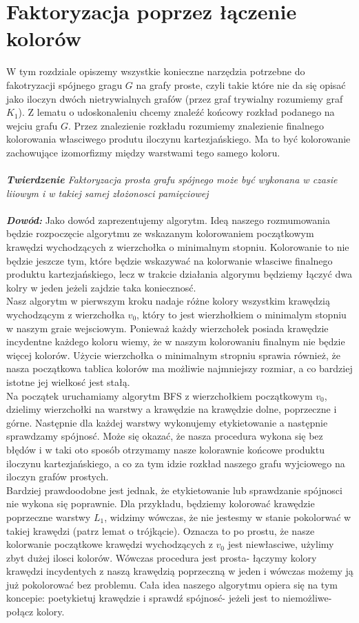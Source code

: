 \documentclass[12pt,a4paper,titlepage]{article}
\begin{document}
\section{Faktoryzacja poprzez łączenie kolorów}
W tym rozdziale opiszemy wszystkie konieczne narzędzia potrzebne do fakotryzacji spójnego gragu $G$ na grafy proste, czyli takie które nie da się opisać jako iloczyn dwóch nietrywialnych grafów (przez graf trywialny rozumiemy graf $K_1$). Z lematu o udoskonaleniu chcemy znaleźć końcowy rozkład podanego na wejciu grafu $G$. Przez znalezienie rozkładu rozumiemy znalezienie finalnego kolorowania własciwego produtu iloczynu kartezjańskiego. Ma to być kolorowanie zachowujące izomorfizmy między warstwami tego samego koloru.\\
\\
\textit{\textbf{Twierdzenie} Faktoryzacja prosta grafu spójnego może być wykonana w czasie liiowym i w takiej samej złożonosci pamięciowej}\\
\\
\textit{\textbf{Dowód:}} Jako dowód zaprezentujemy algorytm. Ideą naszego rozmumowania będzie rozpoczęcie algorytmu ze wskazanym kolorowaniem początkowym krawędzi wychodzących z wierzchołka o minimalnym stopniu. Kolorowanie to nie będzie jeszcze tym, które będzie wskazywać na kolorwanie własciwe finalnego produktu kartezjańskiego, lecz w trakcie działania algorymu będziemy łączyć dwa kolry w jeden jeżeli zajdzie taka koniecznosć. \\
Nasz algorytm w pierwszym kroku nadaje różne kolory wszystkim krawędzią wychodzącym z wierzchołka $v_0$, który to jest wierzhołkiem o minimalym stopniu w naszym graie wejsciowym. Ponieważ każdy wierzchołek posiada krawędzie incydentne każdego koloru wiemy, że w naszym kolorowaniu finalnym nie będzie więcej kolorów. Użycie wierzchołka o minimalnym stropniu sprawia również, że nasza początkowa tablica kolorów ma możliwie najmniejszy rozmiar, a co bardziej istotne jej wielkosć jest stałą. \\
Na początek uruchamiamy algorytm BFS z wierzchołkiem początkowym $v_0$, dzielimy wierzchołki na warstwy a krawędzie na krawędzie dolne, poprzeczne i górne. Następnie dla każdej warstwy wykonujemy etykietowanie a następnie sprawdzamy spójnosć. Może się okazać, że nasza procedura wykona się bez błędów i w taki oto sposób otrzymamy nasze kolorawnie końcowe produktu iloczynu kartezjańskiego, a co za tym idzie rozkład naszego grafu wyjciowego na iloczyn grafów prostych.\\
Bardziej prawdoodobne jest jednak, że etykietowanie lub sprawdzanie spójnosci nie wykona się poprawnie. Dla przykładu, będziemy kolorować krawędzie poprzeczne warstwy $L_1$, widzimy wówczas, że nie jestesmy w stanie pokolorwać w takiej krawędzi (patrz lemat o trójkącie). Oznacza to po prostu, że nasze kolorwanie początkowe krawędzi wychodzących z $v_0$ jest niewłasciwe, użylimy zbyt dużej ilosci kolorów. Wówczas procedura jest prosta- łączymy kolory krawędzi incydentych z naszą krawędzią poprzeczną w jeden i wówczas możemy ją już pokolorować bez problemu. Cała idea naszego algorytmu opiera się na tym koncepie: poetykietuj krawędzie i sprawdź spójnosć- jeżeli jest to niemożliwe- połącz kolory. \\
\end{document}
